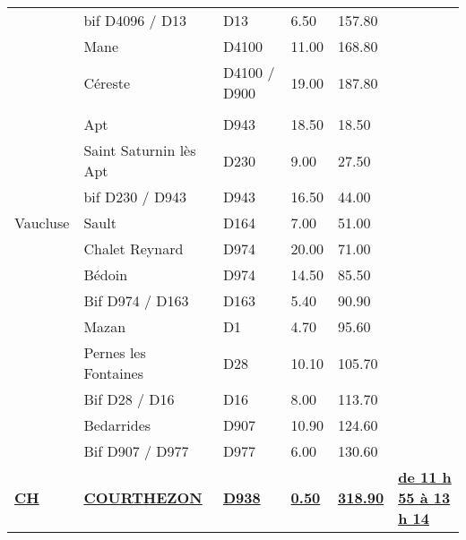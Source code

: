 \documentclass{article}%
\begin{document}
\begin{longtable}{p{2.25cm}|p{6.7cm}|p{2.0cm}|p{1.5cm}|p{1.5cm}|p{3.5cm}}
 &bif D4096 / D13&D13&6.50&157.80& \\%
 &Mane&D4100&11.00&168.80& \\%
 &Céreste&D4100 / D900&19.00&187.80& \\%
\hline& & & & & \\%
 &Apt&D943&18.50&18.50& \\%
 &Saint Saturnin lès Apt&D230&9.00&27.50& \\%
 &bif D230 / D943&D943&16.50&44.00& \\%
Vaucluse   &Sault&D164&7.00&51.00& \\%
 &Chalet Reynard&D974&20.00&71.00& \\%
 &Bédoin&D974&14.50&85.50& \\%
 &Bif D974 / D163&D163&5.40&90.90& \\%
 &Mazan&D1&4.70&95.60& \\%
 &Pernes les Fontaines&D28&10.10&105.70& \\%
 &Bif D28 / D16&D16&8.00&113.70& \\%
 &Bedarrides&D907&10.90&124.60& \\%
 &Bif D907 / D977&D977&6.00&130.60& \\%
\textbf{\underline{CH}}&\textbf{\underline{COURTHEZON}}&\textbf{\underline{D938}}&\textbf{\underline{0.50}}&\textbf{\underline{318.90}}&\textbf{\underline{de 11 h 55 à 13 h 14}}\\%
\hline%
\end{longtable}%
\begin{flushleft} \textit{} \end{flushleft}%
\end{document}
